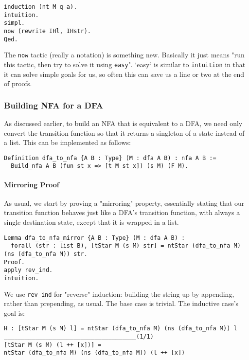 \begin{verbatim}
induction (nt M q a).
intuition.
simpl.
now (rewrite IHl, IHstr).
Qed.
\end{verbatim}

The \texttt{now} tactic (really a notation) is something new.
Basically it just means "run this tactic, then try to solve it using \texttt{easy}".
`easy` is similar to \texttt{intuition} in that it can solve simple goals for us, so often this can save us a line or two at the end of proofs.

\subsubsection{Building NFA for a DFA}

As discussed earlier, to build an NFA that is equivalent to a DFA, we need only convert the transition function so that it returns a singleton of a state instead of a list.
This can be implemented as follows:

\begin{verbatim}
Definition dfa_to_nfa {A B : Type} (M : dfa A B) : nfa A B :=
  Build_nfa A B (fun st x => [t M st x]) (s M) (F M).
\end{verbatim}

\paragraph{Mirroring Proof}

As usual, we start by proving a "mirroring" property, essentially stating that our transition function behaves just like a DFA's transition function, with always a single destination state, except that it is wrapped in a list.

\begin{verbatim}
Lemma dfa_to_nfa_mirror {A B : Type} (M : dfa A B) :
  forall (str : list B), [tStar M (s M) str] = ntStar (dfa_to_nfa M) (ns (dfa_to_nfa M)) str.
Proof.
apply rev_ind.
intuition.
\end{verbatim}

We use \texttt{rev_ind} for "reverse" induction: building the string up by appending, rather than prepending, as usual.
The base case is trivial.
The inductive case's goal is:

\begin{verbatim}
H : [tStar M (s M) l] = ntStar (dfa_to_nfa M) (ns (dfa_to_nfa M)) l
______________________________________(1/1)
[tStar M (s M) (l ++ [x])] =
ntStar (dfa_to_nfa M) (ns (dfa_to_nfa M)) (l ++ [x])
\end{verbatim}


